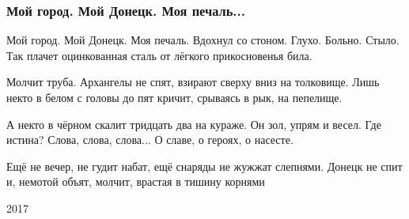  
 
 

\subsubsection{Мой город. Мой Донецк. Моя печаль...}
\label{sec:poetry.rus.dnr.vladislav_rusanov.moj_gorod_moj_donetsk}

Мой город. Мой Донецк. Моя печаль.
Вдохнул со стоном. Глухо. Больно. Стыло.
Так плачет оцинкованная сталь
от лёгкого прикосновенья била.

Молчит труба. Архангелы не спят,
взирают сверху вниз на толковище.
Лишь некто в белом с головы до пят
кричит, срываясь в рык, на пепелище.

А некто в чёрном скалит тридцать два
на кураже. Он зол, упрям и весел.
Где истина? Слова, слова, слова...
О славе, о героях, о насесте.

Ещё не вечер, не гудит набат,
ещё снаряды не жужжат слепнями.
Донецк не спит и, немотой объят,
молчит, врастая в тишину корнями

2017 
